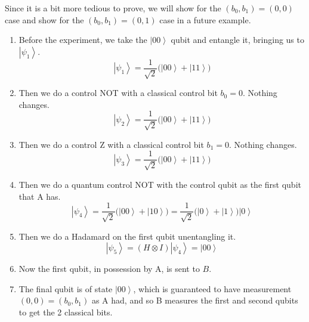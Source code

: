 \documentclass{article}
\newcommand{\ket}[1]{\ensuremath{\left|#1\right\rangle}}
\begin{document}
    \begin{example}
      Since it is a bit more tedious to prove, we will show for the $(b_0, b_1) = (0, 0)$ case and show for the $(b_0, b_1) = (0, 1)$ case in a future example.
      \begin{enumerate} 
        \item Before the experiment, we take the $\ket{00}$ qubit and entangle it, bringing us to $\ket{\psi_1}$. 
          \begin{equation} 
            \ket{\psi_1} = \frac{1}{\sqrt{2}} \big( \ket{00} + \ket{11} \big)
          \end{equation}
        \item Then we do a control NOT with a classical control bit $b_0 = 0$. Nothing changes. 
          \begin{equation} 
            \ket{\psi_2} = \frac{1}{\sqrt{2}} \big( \ket{00} + \ket{11} \big)
          \end{equation}
        \item Then we do a control Z with a classical control bit $b_1 = 0$. Nothing changes. 
          \begin{equation} 
            \ket{\psi_3} = \frac{1}{\sqrt{2}} \big( \ket{00} + \ket{11} \big)
          \end{equation}
        \item Then we do a quantum control NOT with the control qubit as the first qubit that A has. 
          \begin{equation} 
            \ket{\psi_4} = \frac{1}{\sqrt{2}} \big( \ket{00} + \ket{10} \big) = \frac{1}{\sqrt{2}} \big( \ket{0} + \ket{1} \big) \ket{0}
          \end{equation}
        \item Then we do a Hadamard on the first qubit unentangling it. 
          \begin{equation} 
            \ket{\psi_5} = (H \otimes I) \ket{\psi_4} = \ket{00}
          \end{equation}
        \item Now the first qubit, in possession by A, is sent to $B$. 
        \item The final qubit is of state $\ket{00}$, which is guaranteed to have measurement $(0, 0) = (b_0, b_1)$ as A had, and so B measures the first and second qubits to get the 2 classical bits. 
      \end{enumerate}
    \end{example}
\end{document}
